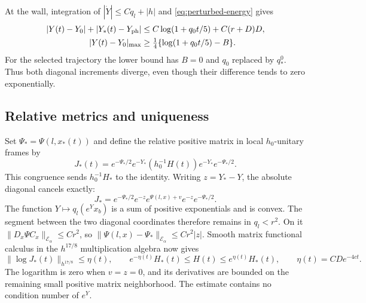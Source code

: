 \documentclass[11pt]{amsart}
\theoremstyle{definition}
\theoremstyle{remark}
\begin{document}
At the wall, integration of $|\dot Y|\le Cq_l+|h|$ and
\eqref{eq:perturbed-energy} gives
\begin{equation}\label{eq:actual-wall-drift}
 \begin{aligned}
 |Y(t)-Y_0|+|Y_*(t)-Y_{\rm ph}|
       &\le C\log(1+q_0t/5)+C(r+D)D,\\
 |Y(t)-Y_0|_{\max}
       &\ge\tfrac14\{\log(1+q_0t/5)-B\}.
 \end{aligned}
\end{equation}
For the selected trajectory the lower bound has $B=0$ and
$q_0$ replaced by $q_*^0$. Thus both diagonal increments
diverge, even though their difference tends to zero exponentially.

\subsection{Relative metrics and uniqueness}
Set $\Psi_*=\Psi(l,x_*(t))$ and define the relative positive
matrix in local $h_0$-unitary frames by
\begin{equation}\label{eq:relative-matrix}
 J_*(t)=e^{-\Psi_*/2}e^{-Y_*}(h_0^{-1}H(t))
                         e^{-Y_*}e^{-\Psi_*/2}.
\end{equation}
This congruence sends $h_0^{-1}H_*$ to the identity.
Writing $z=Y_*-Y$, the absolute diagonal cancels exactly:
\[
 J_*=e^{-\Psi_*/2}e^{-z}e^{\Psi(l,x)+v}e^{-z}e^{-\Psi_*/2}.
\]
The function $Y\mapsto q_l(e^Yx_b)$ is a sum of positive
exponentials and is convex. The segment between the two
diagonal coordinates therefore remains in $q_l<r^2$.
On it $\|D_x\Psi C_x\|_{\mathcal E_\alpha}\le Cr^2$, so
$\|\Psi(l,x)-\Psi_*\|_{\mathcal E_\alpha}\le Cr^2|z|$.
Smooth matrix functional calculus in the $h^{17/8}$
multiplication algebra now gives
\begin{equation}\label{eq:metric-tracking}
 \|\log J_*(t)\|_{h^{17/8}}\le\eta(t),\qquad
 e^{-\eta(t)}H_*(t)\le H(t)\le e^{\eta(t)}H_*(t),\qquad
 \eta(t)=CD e^{-4ct}.
\end{equation}
The logarithm is zero when $v=z=0$, and its derivatives
are bounded on the remaining small positive matrix neighborhood.
The estimate contains no condition number of $e^Y$.
\end{document}
